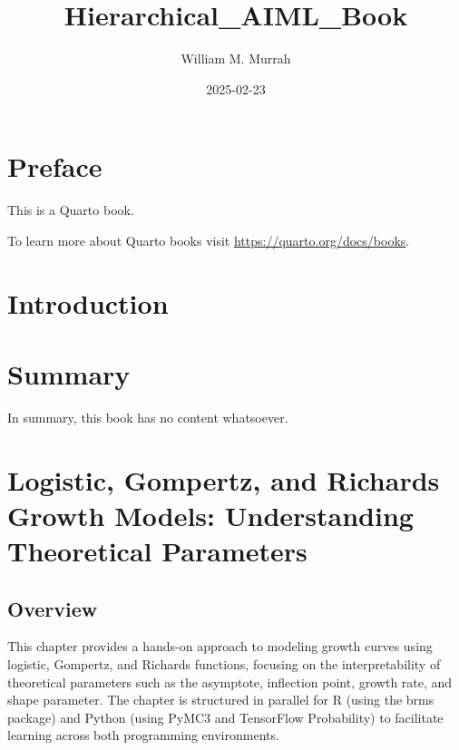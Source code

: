 \documentclass[
  letterpaper,
  DIV=11,
  numbers=noendperiod]{scrreprt}
\title{Hierarchical\_AIML\_Book}
\author{William M. Murrah}
\date{2025-02-23}
\renewcommand*\contentsname{Table of contents}
\newcommand\contentsname{Table of contents}
\begin{document}
\maketitle

\renewcommand*\contentsname{Table of contents}
{
\hypersetup{linkcolor=}
\setcounter{tocdepth}{2}
\tableofcontents
}


\chapter*{Preface}\label{preface}


This is a Quarto book.

To learn more about Quarto books visit
\url{https://quarto.org/docs/books}.


\chapter{Introduction}\label{introduction}


\chapter{Summary}\label{summary}

In summary, this book has no content whatsoever.


\chapter{Logistic, Gompertz, and Richards Growth Models: Understanding
Theoretical
Parameters}\label{logistic-gompertz-and-richards-growth-models-understanding-theoretical-parameters}

\section{Overview}\label{overview}

This chapter provides a hands-on approach to modeling growth curves
using logistic, Gompertz, and Richards functions, focusing on the
interpretability of theoretical parameters such as the asymptote,
inflection point, growth rate, and shape parameter. The chapter is
structured in parallel for R (using the brms package) and Python (using
PyMC3 and TensorFlow Probability) to facilitate learning across both
programming environments.
\end{document}
